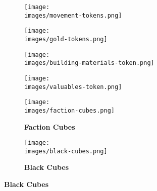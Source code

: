 \begin{figure}[H]
  \centering
  \begin{subfigure}[c]{0.15\linewidth}
    \centering
    \texttt{[image: \\images/movement-tokens.png]}
    \caption{\textbf{}}
  \end{subfigure}
  \begin{subfigure}[c]{0.18\linewidth}
    \centering
    \texttt{[image: \\images/gold-tokens.png]}
    \caption{\textbf{}}
  \end{subfigure}
  \begin{subfigure}[c]{0.12\linewidth}
    \centering
    \texttt{[image: \\images/building-materials-token.png]}
    \caption{\textbf{}}
  \end{subfigure}
  \begin{subfigure}[c]{0.12\linewidth}
    \centering
    \texttt{[image: \\images/valuables-token.png]}
    \caption{\textbf{}}
  \end{subfigure}
  \begin{subfigure}[c]{0.15\linewidth}
    \centering
    \texttt{[image: \\images/faction-cubes.png]}
    \caption{\textbf{Faction Cubes}}
  \end{subfigure}
  \begin{subfigure}[c]{0.15\linewidth}
    \centering
    \texttt{[image: \\images/black-cubes.png]}
    \caption{\textbf{Black Cubes}}
  \end{subfigure}
\end{figure}
\vspace*{-2em}

